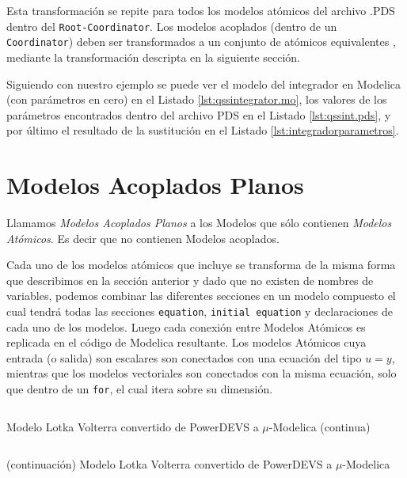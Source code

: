         Esta transformación se repite para todos los modelos atómicos del archivo .PDS dentro del \texttt{Root-Coordinator}. Los modelos acoplados 
        (dentro de un \texttt{Coordinator}) deben ser transformados a un conjunto de atómicos equivalentes , mediante la transformación
	descripta en la siguiente sección.

	Siguiendo con nuestro ejemplo se puede ver el modelo del integrador en Modelica (con parámetros en cero) en el Listado \ref{lst:qssintegrator.mo}, los valores de los parámetros encontrados dentro del archivo PDS en el Listado \ref{lst:qssint.pds}, y por último el resultado de la sustitución en el Listado \ref{lst:integradorparametros}.

\section{Modelos Acoplados Planos}

        Llamamos \emph{Modelos Acoplados Planos} a los Modelos que sólo contienen \emph{Modelos Atómicos}. Es decir que no contienen Modelos acoplados.

        Cada uno de los modelos atómicos que incluye se transforma de la misma forma que describimos en la sección anterior y dado que no existen  
        de nombres de variables, podemos combinar las diferentes secciones en un modelo compuesto el cual tendrá todas las secciones \texttt{equation}, 
	\texttt{initial equation} y declaraciones de cada uno de los modelos.
        Luego cada conexión entre Modelos Atómicos es replicada en el código de Modelica resultante. Los modelos Atómicos cuya entrada (o salida) 
	son escalares son conectados con una ecuación del tipo $u = y$, mientras que los modelos vectoriales son conectados con la misma ecuación, 
	solo que dentro de un \texttt{for}, el cual itera sobre su dimensión.

\begin{listing}[H]
        \inputminted[linenos,lastline=21]{modelica}{src/lotka_volterra-orig.mo}
        \caption{Modelo Lotka Volterra convertido de PowerDEVS a $\mu$-Modelica (continua)}
        \label{lst:lotka_volterra-orig.mo}
\end{listing}

\begin{listing}[H]
        \inputminted[linenos,firstline=22]{modelica}{src/lotka_volterra-orig.mo}
        \caption{(continuación) Modelo Lotka Volterra convertido de PowerDEVS a $\mu$-Modelica}
        \label{lst:lotka_volterra-orig.mo-2}
\end{listing}



